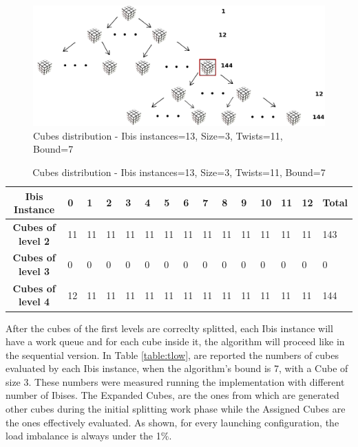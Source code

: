\documentclass[a4paper]{article}
\begin{document}
\begin{figure}[!ht]
  \centering
  \includegraphics[width=0.7\linewidth]{rubik_tree_eval4}
  \caption{Cubes distribution - Ibis instances=13, Size=3, Twists=11, Bound=7}
  \label{fig:ev3}
\end{figure}
\FloatBarrier

\begin{table}[!ht]
\centering
\begin{tabular}{|l|l|l|l|l|l|l|l|l|l|l|l|l|l|l|}
\multicolumn{1}{|c||}{\bfseries Ibis Instance} & 0 & 1 & 2 & 3 & 4 & 5 & 6 & 7 & 8 & 9 & 10 & 11 & 12 & \multicolumn{1}{|c|}{\bfseries Total} \\ \hline
\multicolumn{1}{|c||}{\bfseries Cubes of level 2} & 11 & 11 & 11 & 11 & 11 & 11 & 11 & 11 & 11 & 11 & 11 & 11 & 11 & 143 \\ \hline
\multicolumn{1}{|c||}{\bfseries Cubes of level 3} & 0 & 0 & 0 & 0 & 0 & 0 & 0 & 0 & 0 & 0 & 0 & 0 & 0 & 0  \\ \hline
\multicolumn{1}{|c||}{\bfseries Cubes of level 4} & 12 & 11 & 11 & 11 & 11 & 11 & 11 & 11 & 11 & 11 & 11 & 11 & 11 & 144
\end{tabular}
\caption{Cubes distribution - Ibis instances=13, Size=3, Twists=11, Bound=7}
\label{table:tev3}
\end{table}
\FloatBarrier

After the cubes of the first levels are correclty splitted, each Ibis instance will have a work queue and for each cube inside it, the algorithm will proceed like in the sequential version.
In Table \ref{table:tlow}, are reported the numbers of cubes evaluated by each Ibis instance, when the algorithm's bound is 7, with a Cube of size 3. These numbers were measured running the implementation with different number of Ibises. The Expanded Cubes, are the ones from which are generated other cubes during the initial splitting work phase while the Assigned Cubes are the ones effectively evaluated. As shown, for every launching configuration, the load imbalance is always under the 1\%.
\end{document}
